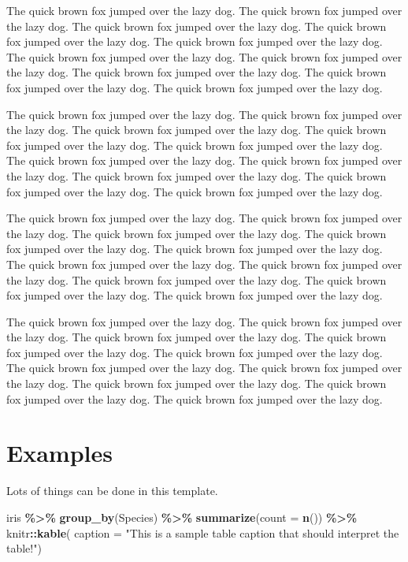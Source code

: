 \documentclass[12pt]{article}
\newenvironment{Shaded}{\begin{snugshade}}{\end{snugshade}}
\newcommand{\AttributeTok}[1]{\textcolor[rgb]{0.13,0.29,0.53}{#1}}
\newcommand{\FunctionTok}[1]{\textcolor[rgb]{0.13,0.29,0.53}{\textbf{#1}}}
\newcommand{\NormalTok}[1]{#1}
\newcommand{\SpecialCharTok}[1]{\textcolor[rgb]{0.81,0.36,0.00}{\textbf{#1}}}
\newcommand{\StringTok}[1]{\textcolor[rgb]{0.31,0.60,0.02}{#1}}
\begin{document}
The quick brown fox jumped over the lazy dog. The quick brown fox jumped
over the lazy dog. The quick brown fox jumped over the lazy dog. The
quick brown fox jumped over the lazy dog. The quick brown fox jumped
over the lazy dog. The quick brown fox jumped over the lazy dog. The
quick brown fox jumped over the lazy dog. The quick brown fox jumped
over the lazy dog. The quick brown fox jumped over the lazy dog. The
quick brown fox jumped over the lazy dog.

The quick brown fox jumped over the lazy dog. The quick brown fox jumped
over the lazy dog. The quick brown fox jumped over the lazy dog. The
quick brown fox jumped over the lazy dog. The quick brown fox jumped
over the lazy dog. The quick brown fox jumped over the lazy dog. The
quick brown fox jumped over the lazy dog. The quick brown fox jumped
over the lazy dog. The quick brown fox jumped over the lazy dog. The
quick brown fox jumped over the lazy dog.

The quick brown fox jumped over the lazy dog. The quick brown fox jumped
over the lazy dog. The quick brown fox jumped over the lazy dog. The
quick brown fox jumped over the lazy dog. The quick brown fox jumped
over the lazy dog. The quick brown fox jumped over the lazy dog. The
quick brown fox jumped over the lazy dog. The quick brown fox jumped
over the lazy dog. The quick brown fox jumped over the lazy dog. The
quick brown fox jumped over the lazy dog.

The quick brown fox jumped over the lazy dog. The quick brown fox jumped
over the lazy dog. The quick brown fox jumped over the lazy dog. The
quick brown fox jumped over the lazy dog. The quick brown fox jumped
over the lazy dog. The quick brown fox jumped over the lazy dog. The
quick brown fox jumped over the lazy dog. The quick brown fox jumped
over the lazy dog. The quick brown fox jumped over the lazy dog. The
quick brown fox jumped over the lazy dog.

\hypertarget{examples}{%
\section{Examples}\label{examples}}

Lots of things can be done in this template.

\begin{Shaded}
\begin{Highlighting}[]
\NormalTok{iris }\SpecialCharTok{\%\textgreater{}\%}
  \FunctionTok{group\_by}\NormalTok{(Species) }\SpecialCharTok{\%\textgreater{}\%}
  \FunctionTok{summarize}\NormalTok{(}\AttributeTok{count =} \FunctionTok{n}\NormalTok{()) }\SpecialCharTok{\%\textgreater{}\%}
\NormalTok{  knitr}\SpecialCharTok{::}\FunctionTok{kable}\NormalTok{(}
    \AttributeTok{caption =} \StringTok{"This is a sample table caption that should interpret the table!"}\NormalTok{)}
\end{Highlighting}
\end{Shaded}
\end{document}
